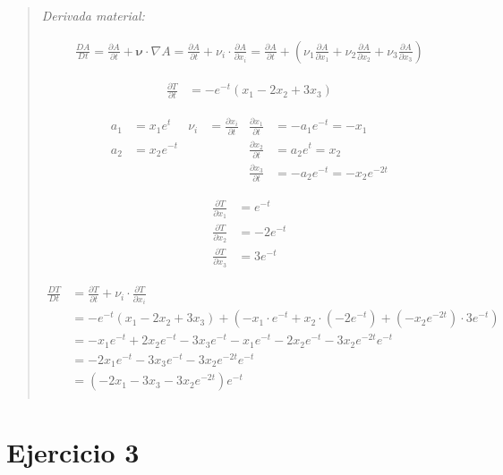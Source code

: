 \documentclass[a4paper,10pt,twoside,final,spanish]{article}
\begin{document}
\begin{quote}
\textit{Derivada material:}

\begin{align*}
\frac{DA}{Dt}=\frac{\partial A}{\partial t}+\mathbf{\nu}\cdot\nabla A
=\frac{\partial A}{\partial t}+\nu_{i}\cdot\frac{\partial A}{\partial x_{i}}
=\frac{\partial A}{\partial t}+\left(
\nu_{1}\frac{\partial A}{\partial x_{1}}
+\nu_{2}\frac{\partial A}{\partial x_{2}}
+\nu_{3}\frac{\partial A}{\partial x_{3}}
\right)
\end{align*}

\begin{align*}
\frac{\partial T}{\partial t} &= -e^{-t}(x_{1}-2x_{2}+3x_{3}) 
\end{align*}

\begin{align*}
a_{1} &= x_{1}e^{t}
& \nu_{i} &= \frac{\partial x_{i}}{\partial t}
& \frac{\partial x_{1}}{\partial t} &= -a_{1}e^{-t}=-x_{1} \\
a_{2} &= x_{2}e^{-t}
&&& \frac{\partial x_{2}}{\partial t} &= a_{2}e^{t}=x_{2} \\
&&&& \frac{\partial x_{3}}{\partial t} &= -a_{2}e^{-t}=-x_{2}e^{-2t}
\end{align*}

\begin{align*}
\frac{\partial T}{\partial x_{1}} &= e^{-t} \\
\frac{\partial T}{\partial x_{2}} &= -2e^{-t} \\
\frac{\partial T}{\partial x_{3}} &= 3e^{-t}
\end{align*}

\begin{align*}
\frac{DT}{Dt} &= \frac{\partial T}{\partial t}+\nu_{i}\cdot\frac{\partial T}{\partial x_{i}}\\
&= -e^{-t}(x_{1}-2x_{2}+3x_{3})
+\left(-x_{1}\cdot e^{-t}+x_{2}\cdot(-2e^{-t})+(-x_{2}e^{-2t})\cdot3e^{-t}\right) \\
&= -x_{1}e^{-t}+2x_{2}e^{-t}-3x_{3}e^{-t}-x_{1}e^{-t}-2x_{2}e^{-t}-3x_{2}e^{-2t}e^{-t} \\
&= -2x_{1}e^{-t}-3x_{3}e^{-t}-3x_{2}e^{-2t}e^{-t} \\
&= (-2x_{1}-3x_{3}-3x_{2}e^{-2t})e^{-t} \\
\end{align*}

\end{quote}

\section*{Ejercicio 3}
\end{document}
